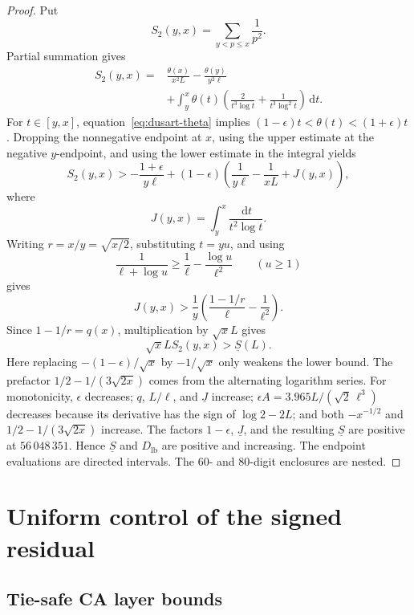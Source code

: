 \documentclass[11pt,a4paper]{article}
\numberwithin{equation}{section}
\theoremstyle{definition}
\newcommand{\Xdirect}{56\,048\,351}
\newcommand{\dd}{\,\mathrm{d}}
\begin{document}
\begin{proof}
Put
\[
  S_2(y,x)=\sum_{y<p\le x}\frac1{p^2}.
\]
Partial summation gives
\[
\begin{aligned}
  S_2(y,x)
  ={}&
  \frac{\theta(x)}{x^2L}
  -\frac{\theta(y)}{y^2\ell}\\
  &+
  \int_y^x\theta(t)
  \left(\frac2{t^3\log t}+\frac1{t^3\log^2t}\right)\dd t.
\end{aligned}
\]
For \(t\in[y,x]\), equation~\eqref{eq:dusart-theta} implies
\((1-\epsilon)t<\theta(t)<(1+\epsilon)t\).  Dropping the nonnegative
endpoint at \(x\), using the upper estimate at the negative \(y\)-endpoint,
and using the lower estimate in the integral yields
\[
  S_2(y,x)
  >
  -\frac{1+\epsilon}{y\ell}
  +(1-\epsilon)
  \left(\frac1{y\ell}-\frac1{xL}+J(y,x)\right),
\]
where
\[
  J(y,x)=\int_y^x\frac{\dd t}{t^2\log t}.
\]
Writing \(r=x/y=\sqrt{x/2}\), substituting \(t=yu\), and using
\[
  \frac1{\ell+\log u}
  \ge
  \frac1\ell-\frac{\log u}{\ell^2}
  \qquad(u\ge1)
\]
gives
\[
  J(y,x)
  >
  \frac1y\left(\frac{1-1/r}{\ell}-\frac1{\ell^2}\right).
\]
Since \(1-1/r=q(x)\), multiplication by \(\sqrt{x}L\) gives
\[
  \sqrt{x}L
  S_2(y,x)
  >
  \underline S(L).
\]
Here replacing \(-(1-\epsilon)/\sqrt{x}\) by \(-1/\sqrt{x}\) only weakens
the lower bound.  The prefactor \(1/2-1/(3\sqrt{2x})\) comes from the
alternating logarithm series.  For monotonicity, \(\epsilon\) decreases;
\(q\), \(L/\ell\), and \(\underline J\) increase;
\(\epsilon A=3.965L/(\sqrt2\,\ell^3)\) decreases because its derivative
has the sign of \(\log2-2L\); and both
\(-x^{-1/2}\) and \(1/2-1/(3\sqrt{2x})\) increase.  The factors
\(1-\epsilon\), \(\underline J\), and the resulting
\(\underline S\) are positive at \(\Xdirect\).  Hence
\(\underline S\) and \(D_{\mathrm{lb}}\) are positive and increasing.
The endpoint evaluations are directed intervals.  The \(60\)- and
\(80\)-digit enclosures are nested.
\end{proof}

\section{Uniform control of the signed residual}

\subsection{Tie-safe CA layer bounds}
\end{document}
